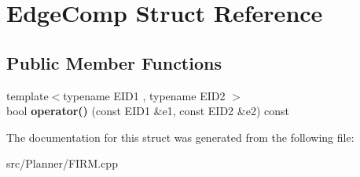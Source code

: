\hypertarget{struct_edge_comp}{\section{\-Edge\-Comp \-Struct \-Reference}
\label{struct_edge_comp}
}
\subsection*{\-Public \-Member \-Functions}
\begin{DoxyCompactItemize}
\item 
\hypertarget{struct_edge_comp_a90f9e5edf3656c4b574d58a2323805dc}{{\footnotesize template$<$typename E\-I\-D1 , typename E\-I\-D2 $>$ }\\bool {\bfseries operator()} (const \-E\-I\-D1 \&e1, const \-E\-I\-D2 \&e2) const }\label{struct_edge_comp_a90f9e5edf3656c4b574d58a2323805dc}

\end{DoxyCompactItemize}


\-The documentation for this struct was generated from the following file\-:\begin{DoxyCompactItemize}
\item 
src/\-Planner/\-F\-I\-R\-M.\-cpp\end{DoxyCompactItemize}
